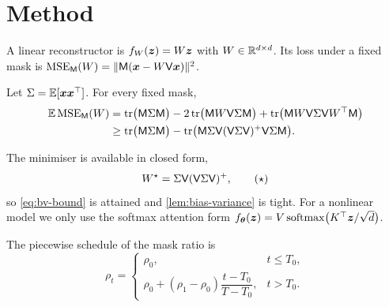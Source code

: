\section{Method}\label{sec:method}

\begin{definition}\label{def:linear}
  A linear reconstructor is $f_{W}(\vz) = W\vz$ with $W \in \Reals^{d \times d}$. Its
  loss under a fixed mask is $\mse[\mask]{W} = \norm{\mask(\vx - W\vis\vx)}^2$.
\end{definition}

\begin{lemma}\label{lem:bias-variance}
  Let $\Sigma = \Exp[\vx\vx^\top]$. For every fixed mask,
  \begin{subequations}\label{eq:bv}
    \begin{align}
      \Exp \mse[\mask]{W}
        &= \tr\bigl(\mask \Sigma \mask\bigr)
         - 2\tr\bigl(\mask W \vis \Sigma \mask\bigr)
         + \tr\bigl(\mask W \vis \Sigma \vis W^\top \mask\bigr) \label{eq:bv-expand} \\
        &\ge \tr\bigl(\mask \Sigma \mask\bigr)
         - \tr\bigl(\mask \Sigma \vis (\vis \Sigma \vis)^{+} \vis \Sigma \mask\bigr). \label{eq:bv-bound}
    \end{align}
  \end{subequations}
\end{lemma}



The minimiser is available in closed form,
\begin{equation}
  W^\star = \Sigma \vis (\vis \Sigma \vis)^{+}, \tag{$\star$}\label{eq:wstar}
\end{equation}
so \eqref{eq:bv-bound} is attained and \cref{lem:bias-variance} is tight. For a
nonlinear model we only use the softmax attention form
$f_{\vtheta}(\vz) = V \softmax\bigl(K^\top \vz / \sqrt{d}\bigr)$.

The piecewise schedule of the mask ratio is
\[
  \rho_t =
  \begin{cases}
    \rho_0, & t \le T_0, \\
    \rho_0 + (\rho_1 - \rho_0)\dfrac{t - T_0}{T - T_0}, & t > T_0.
  \end{cases}
\]
